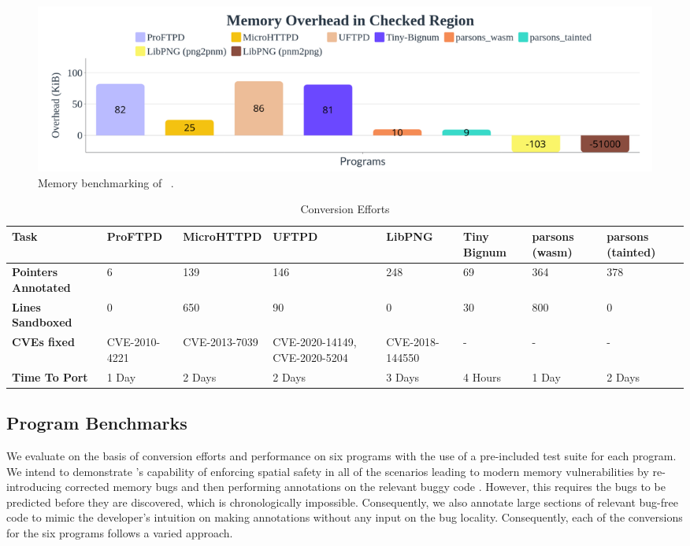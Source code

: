 \begin{figure}[t]
\includegraphics[width=1.0\linewidth]{images/program_memory_benchmark.png}
\caption{Memory benchmarking of ~\systemname.}
\label{fig:memory}
\end{figure}


\begin{table}[htb]
  \centering
  \begin{tabular}{|p{2.6 cm }|p{1.6 cm}|p{1.9cm}|p{1.7cm}|p{2cm}|p{1.5cm}|p{1.5cm}|p{1.5cm}|}
    \hline
    \textbf{Task} & \textbf{ProFTPD} & \textbf{MicroHTTPD} & \textbf{UFTPD} & \textbf{LibPNG} & \textbf{Tiny Bignum} & \textbf{parsons (wasm)} & \textbf{parsons (tainted) }\\
    \hline
     \textbf{Pointers Annotated} & 6 & 139 & 146 & 248 & 69 & 364 & 378 \\
     \textbf{Lines Sandboxed} & 0 & 650 & 90 & 0 & 30 & 800 & 0  \\
     \textbf{CVEs fixed} & CVE-2010-4221 & CVE-2013-7039 & CVE-2020-14149, CVE-2020-5204 & CVE-2018-144550 & - & - & -  \\
     \textbf{Time To Port} & 1 Day & 2 Days & 2 Days & 3 Days & 4 Hours & 1 Day & 2 Days \\
    \hline
  \end{tabular}
  \caption{Conversion Efforts}
\end{table}


\subsection{Program Benchmarks}
We evaluate \systemname on the basis of conversion efforts and performance on six programs with the use of a pre-included test suite for each program. We intend to demonstrate \systemname's capability of enforcing spatial safety in all of the scenarios leading to modern memory vulnerabilities by re-introducing corrected memory bugs and then performing \systemname annotations on the relevant buggy code . However, this requires the bugs to be predicted before they are discovered, which is chronologically impossible. Consequently, we also annotate large sections of relevant bug-free code to mimic the developer's intuition on making \systemname annotations without any input on the bug locality. Consequently, each of the conversions for the six programs follows a varied approach. 

